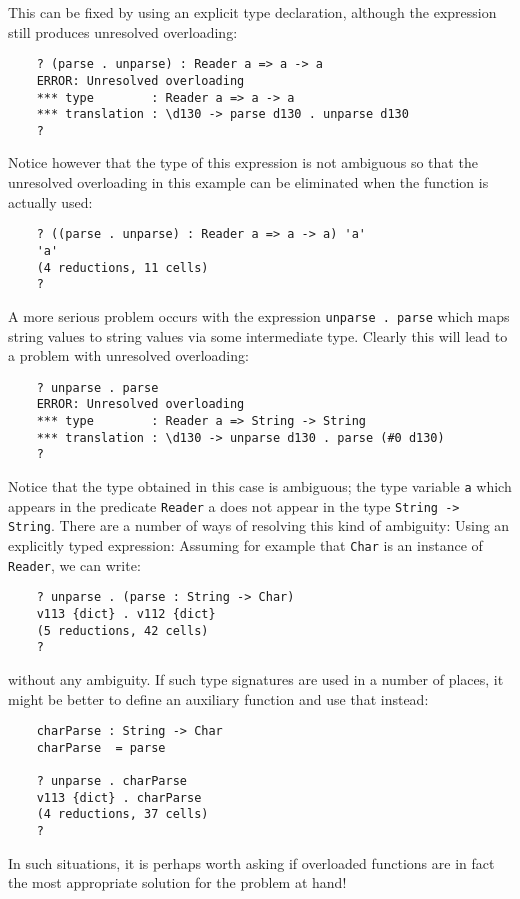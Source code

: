 This can be fixed by using an explicit type declaration,  although  the
expression still produces unresolved overloading:
\begin{verbatim}
    ? (parse . unparse) : Reader a => a -> a
    ERROR: Unresolved overloading
    *** type        : Reader a => a -> a
    *** translation : \d130 -> parse d130 . unparse d130
    ?
\end{verbatim}
Notice however that the type of this expression  is  not  ambiguous  so
that the unresolved overloading in this example can be eliminated  when
the function is actually used:
\begin{verbatim}
    ? ((parse . unparse) : Reader a => a -> a) 'a'
    'a'
    (4 reductions, 11 cells)
    ?
\end{verbatim}
A more serious problem occurs with the  expression  \verb"unparse . parse"
which maps string values to string values via some  intermediate  type.
Clearly this will lead to a problem with unresolved overloading:
\begin{verbatim}
    ? unparse . parse
    ERROR: Unresolved overloading
    *** type        : Reader a => String -> String
    *** translation : \d130 -> unparse d130 . parse (#0 d130)
    ?
\end{verbatim}
Notice that the type obtained in  this  case  is  ambiguous;  the  type
variable \verb"a" which appears in the predicate 
\verb"Reader" a does not  appear  in
the type \verb"String -> String".  There are a number  of  ways  of  resolving
this kind of ambiguity:
\BI
\IT  Using an explicitly typed expression: Assuming  for  example  that
     \verb"Char" is an instance of \verb"Reader", we can write:
\begin{verbatim}
    ? unparse . (parse : String -> Char)
    v113 {dict} . v112 {dict}
    (5 reductions, 42 cells)
    ?
\end{verbatim}
     without any ambiguity.  If such type  signatures  are  used  in  a
     number of places, it  might  be  better  to  define  an  auxiliary
     function and use that instead:
\begin{verbatim}
    charParse : String -> Char
    charParse  = parse

    ? unparse . charParse
    v113 {dict} . charParse
    (4 reductions, 37 cells)
    ?
\end{verbatim}
     In such situations, it  is  perhaps  worth  asking  if  overloaded
     functions are in  fact  the  most  appropriate  solution  for  the
     problem at hand!

